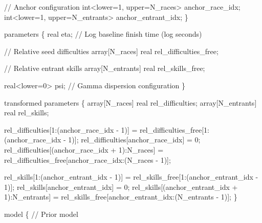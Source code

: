 \documentclass[
  letterpaper,
  DIV=11,
  numbers=noendperiod]{scrartcl}
\newenvironment{Shaded}{\begin{snugshade}}{\end{snugshade}}
\newcommand{\CommentTok}[1]{\textcolor[rgb]{0.37,0.37,0.37}{#1}}
\newcommand{\DataTypeTok}[1]{\textcolor[rgb]{0.68,0.00,0.00}{#1}}
\newcommand{\DecValTok}[1]{\textcolor[rgb]{0.68,0.00,0.00}{#1}}
\newcommand{\KeywordTok}[1]{\textcolor[rgb]{0.00,0.23,0.31}{#1}}
\newcommand{\NormalTok}[1]{\textcolor[rgb]{0.00,0.23,0.31}{#1}}
\begin{document}
\begin{codelisting}
\begin{Shaded}
\begin{Highlighting}[]
  \CommentTok{// Anchor configuration}
  \DataTypeTok{int}\NormalTok{\textless{}}\KeywordTok{lower}\NormalTok{=}\DecValTok{1}\NormalTok{, }\KeywordTok{upper}\NormalTok{=N\_races\textgreater{} anchor\_race\_idx;}
  \DataTypeTok{int}\NormalTok{\textless{}}\KeywordTok{lower}\NormalTok{=}\DecValTok{1}\NormalTok{, }\KeywordTok{upper}\NormalTok{=N\_entrants\textgreater{} anchor\_entrant\_idx;}
\NormalTok{\}}

\KeywordTok{parameters}\NormalTok{ \{}
  \DataTypeTok{real}\NormalTok{ eta; }\CommentTok{// Log baseline finish time (log seconds)}

  \CommentTok{// Relative seed difficulties}
  \DataTypeTok{array}\NormalTok{[N\_races] }\DataTypeTok{real}\NormalTok{ rel\_difficulties\_free;}

  \CommentTok{// Relative entrant skills}
  \DataTypeTok{array}\NormalTok{[N\_entrants] }\DataTypeTok{real}\NormalTok{ rel\_skills\_free;}

  \DataTypeTok{real}\NormalTok{\textless{}}\KeywordTok{lower}\NormalTok{=}\DecValTok{0}\NormalTok{\textgreater{} psi; }\CommentTok{// Gamma dispersion configuration}
\NormalTok{\}}

\KeywordTok{transformed parameters}\NormalTok{ \{}
  \DataTypeTok{array}\NormalTok{[N\_races] }\DataTypeTok{real}\NormalTok{ rel\_difficulties;}
  \DataTypeTok{array}\NormalTok{[N\_entrants] }\DataTypeTok{real}\NormalTok{ rel\_skills;}

\NormalTok{  rel\_difficulties[}\DecValTok{1}\NormalTok{:(anchor\_race\_idx {-} }\DecValTok{1}\NormalTok{)]}
\NormalTok{    =  rel\_difficulties\_free[}\DecValTok{1}\NormalTok{:(anchor\_race\_idx {-} }\DecValTok{1}\NormalTok{)];}
\NormalTok{  rel\_difficulties[anchor\_race\_idx] = }\DecValTok{0}\NormalTok{;}
\NormalTok{  rel\_difficulties[(anchor\_race\_idx + }\DecValTok{1}\NormalTok{):N\_races]}
\NormalTok{    = rel\_difficulties\_free[anchor\_race\_idx:(N\_races {-} }\DecValTok{1}\NormalTok{)];}

\NormalTok{  rel\_skills[}\DecValTok{1}\NormalTok{:(anchor\_entrant\_idx {-} }\DecValTok{1}\NormalTok{)]}
\NormalTok{    =  rel\_skills\_free[}\DecValTok{1}\NormalTok{:(anchor\_entrant\_idx {-} }\DecValTok{1}\NormalTok{)];}
\NormalTok{  rel\_skills[anchor\_entrant\_idx] = }\DecValTok{0}\NormalTok{;}
\NormalTok{  rel\_skills[(anchor\_entrant\_idx + }\DecValTok{1}\NormalTok{):N\_entrants]}
\NormalTok{    = rel\_skills\_free[anchor\_entrant\_idx:(N\_entrants {-} }\DecValTok{1}\NormalTok{)];}
\NormalTok{\}}

\KeywordTok{model}\NormalTok{ \{}
  \CommentTok{// Prior model}


\end{Highlighting}
\end{Shaded}
\end{codelisting}
\end{document}
